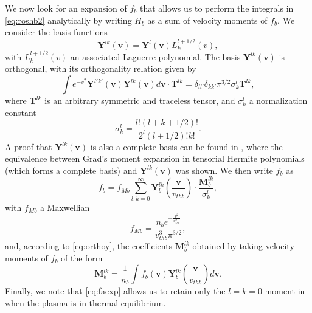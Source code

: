 We now look for an expansion of $f_b$ that allows us to perform the integrals in \cref{eq:roshb2} analytically by writing $H_b$ as a sum of velocity moments of $f_b$.
%
We consider the basis functions
%
\begin{equation}
    \mathbf Y^{lk}(\mathbf v) = \mathbf Y^{l}\left(\mathbf v\right) L_k^{l+1/2}(v),
\end{equation}
%
with $L_k^{l+1/2}(v)$ an associated Laguerre polynomial.
%
The basis $\mathbf Y^{lk}(\mathbf v)$ is orthogonal, with its orthogonality relation given by \citep{Banach1989,Snider2018}
%
\begin{equation}
    \int e^{-v^2} \mathbf Y^{l'k'}(\mathbf v) \mathbf Y^{lk}(\mathbf v) d \mathbf v \cdot {\mathbf T^{lk}}= \delta_{ll'}\delta_{kk'} \pi^{3/2} \sigma_{k}^l {\mathbf T^{lk}},
\label{eq:orthoy}
\end{equation}
%
where $\mathbf T^{lk}$ is an arbitrary symmetric and traceless tensor, and $\sigma_k^l$ a normalization constant
%
\begin{equation}
    \sigma_k^l=\frac{l!(l+k+1/2)!}{2^l(l+1/2)!k!}.
\end{equation}
%
A proof that $\mathbf Y^{lk}(\mathbf v)$ is also a complete basis can be found in \citet{Banach1989}, where the equivalence between Grad's moment expansion in tensorial Hermite polynomials (which forms a complete basis) and $\mathbf Y^{lk}(\mathbf v)$ was shown.
%
We then write $f_b$ as
%
\begin{equation}
    f_b = f_{Mb}\sum_{l,k=0}^{\infty} \mathbf Y_b^{lk}\left(\frac{\mathbf v}{v_{thb}}\right) \cdot \frac{\mathbf M_b^{lk}}{\sigma_{k}^l},
\label{eq:faexp}
\end{equation}
%
with $f_{Mb}$ a Maxwellian
%
\begin{equation}
    f_{Mb}=\frac{n_b e^{-\frac{v^2}{v_{thb}^2}}}{v_{thb}^3 \pi^{3/2}},
\end{equation}
%
and, according to \cref{eq:orthoy}, the coefficients $\mathbf M^{lk}_b$ obtained by taking velocity moments of $f_b$ of the form
%
\begin{equation}
    \mathbf M^{lk}_b=\frac{1}{n_b}\int f_b(\mathbf v) \mathbf Y_b^{lk}\left(\frac{\mathbf v}{v_{thb}}\right) d\mathbf v.
\label{eq:defmaln}
\end{equation}
%
Finally, we note that \cref{eq:faexp} allows us to retain only the $l=k=0$ moment in  when the plasma is in thermal equilibrium.

